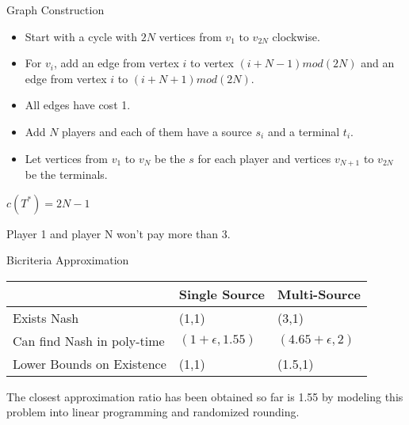 \documentclass[11pt,aspectratio=169]{beamer}
\begin{document}
\begin{frame}{Graph Construction }

    \begin{itemize}
        \item Start with a cycle with $2N$ vertices from $v_1 \text{ to } v_{2N}$ clockwise. 
        \item For $v_i$, add an edge from vertex $i$ to vertex $(i+N-1)mod (2N)$ and an edge from vertex $i$ to $(i+N+1)mod (2N)$.
        \item All edges have cost 1. 
        \item Add $N$ players and each of them have a source $s_i$ and a terminal $t_i$. 
        \item Let vertices from $v_1$ to $v_N$ be the $s$ for each player and vertices $v_{N+1}$ to $v_{2N}$ be the terminals.
    \end{itemize}
    
\end{frame}

\begin{frame}
    $c(T^*) = 2N-1$\\
    \begin{lemma}
        Player 1 and player N won't pay more than 3. 
    \end{lemma}
\end{frame}

\begin{frame}{Bicriteria Approximation}
    \begin{center}
        \begin{tabular} { 
            | m{5cm} | m{3cm}| m{3cm} | }
           \hline
            & Single Source & Multi-Source\\
           \hline
           Exists Nash  & (1,1)  &  (3,1)\\
          \hline
          Can find Nash in poly-time & $(1+\epsilon,1.55)$ & $(4.65+\epsilon,2)$\\
          \hline
          Lower Bounds on Existence & (1,1) & (1.5,1)\\
          \hline
          \end{tabular}
    \end{center}
      \vspace{10pt}
    The closest approximation ratio has been obtained so far is 1.55 by modeling this problem into linear programming and randomized rounding.
\end{frame}
\end{document}
